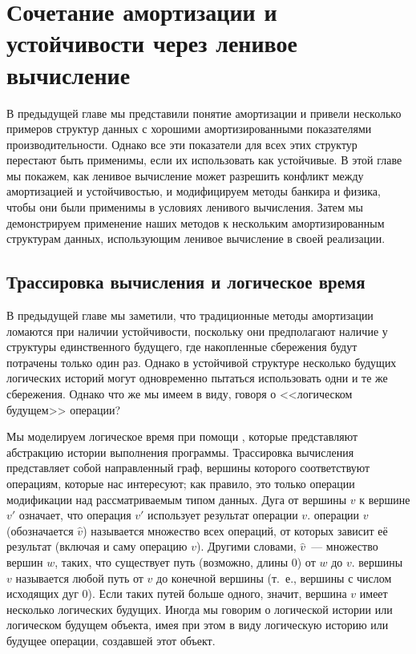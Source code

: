 \chapter{Сочетание амортизации и устойчивости через ленивое
  вычисление}
\label{ch:6}

В предыдущей главе мы представили понятие амортизации и привели
несколько примеров структур данных с хорошими амортизированными
показателями производительности. Однако все эти показатели для всех этих
структур перестают быть применимы, если их использовать как
устойчивые. В этой главе мы покажем, как ленивое вычисление может
разрешить конфликт между амортизацией и устойчивостью, и модифицируем
методы банкира и физика, чтобы они были применимы в условиях ленивого
вычисления. Затем мы демонстрируем применение наших методов к
нескольким амортизированным структурам данных, использующим ленивое
вычисление в своей реализации.

\section{Трассировка вычисления и логическое время}
\label{sc:6.1}

В предыдущей главе мы заметили, что традиционные методы амортизации
ломаются при наличии устойчивости, поскольку они предполагают наличие
у структуры единственного будущего, где накопленные сбережения будут
потрачены только один раз. Однако в устойчивой структуре несколько
будущих логических историй могут одновременно пытаться
использовать одни и те же сбережения. Однако что же мы имеем в виду,
говоря о <<логическом будущем>> операции?

Мы моделируем логическое время при помощи , которые представляют абстракцию
истории выполнения программы. Трассировка вычисления представляет собой
направленный граф, вершины которого соответствуют операциям, которые
нас интересуют; как правило, это только операции модификации над
рассматриваемым типом данных. Дуга от вершины $v$ к вершине $v'$
означает, что операция $v'$ использует результат операции
$v$.  операции $v$
(обозначается $\hat{v}$) называется
множество всех операций, от которых зависит её результат (включая и
саму операцию $v$). Другими словами, $\hat{v}$~--- множество вершин
$w$, таких, что существует путь (возможно, длины 0) от $w$ до $v$. 
 вершины $v$ называется любой
путь от $v$ до конечной вершины (т.~е., вершины с числом исходящих дуг
0). Если таких путей больше одного, значит, вершина $v$ имеет
несколько логических будущих. Иногда мы говорим о логической истории
или логическом будущем объекта, имея при этом в виду логическую
историю или будущее операции, создавшей этот объект.

